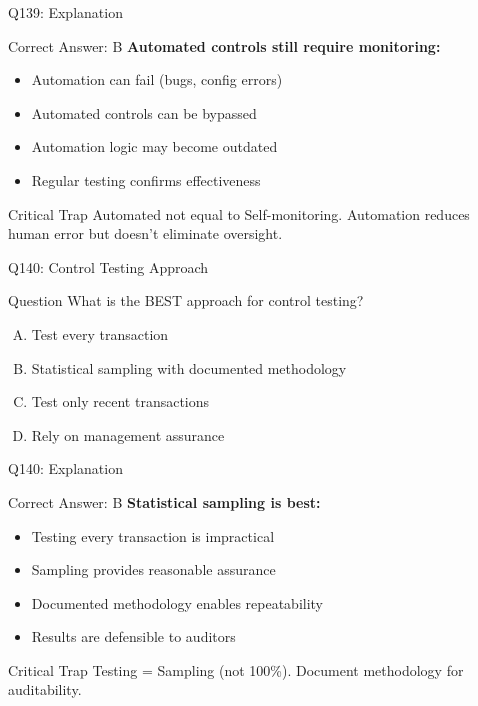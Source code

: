 \documentclass{beamer}
\begin{document}
	\begin{frame}{Q139: Explanation}
		\begin{block}{Correct Answer: B}
			\textbf{Automated controls still require monitoring:}
			\begin{itemize}
				\item Automation can fail (bugs, config errors)
				\item Automated controls can be bypassed
				\item Automation logic may become outdated
				\item Regular testing confirms effectiveness
			\end{itemize}
		\end{block}
		\begin{alertblock}{Critical Trap}
			Automated not equal to Self-monitoring.
			Automation reduces human error but doesn't eliminate oversight.
		\end{alertblock}
	\end{frame}
	
	\begin{frame}{Q140: Control Testing Approach}
		\begin{block}{Question}
			What is the BEST approach for control testing?
		\end{block}
		\begin{enumerate}[(A)]
			\item Test every transaction
			\item Statistical sampling with documented methodology
			\item Test only recent transactions
			\item Rely on management assurance
		\end{enumerate}
	\end{frame}
	
	\begin{frame}{Q140: Explanation}
		\begin{block}{Correct Answer: B}
			\textbf{Statistical sampling is best:}
			\begin{itemize}
				\item Testing every transaction is impractical
				\item Sampling provides reasonable assurance
				\item Documented methodology enables repeatability
				\item Results are defensible to auditors
			\end{itemize}
		\end{block}
		\begin{alertblock}{Critical Trap}
			Testing = Sampling (not 100\%).
			Document methodology for auditability.
		\end{alertblock}
	\end{frame}
	
\end{document}
